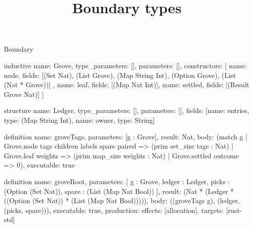 \begin{lexlean}{Boundary}
\title{Boundary types}
\begin{semanticmodule}
inductive{
  name: Grove,
  type_parameters: [],
  parameters: [],
  constructors: [
    {
      name: node,
      fields: [(Set Nat), (List Grove), (Map String Int), (Option Grove), (List (Nat * Grove))]
    },
    {name: leaf, fields: [(Map Nat Int)]},
    {name: settled, fields: [(Result Grove Nat)]}
  ]
}

structure{
  name: Ledger,
  type_parameters: [],
  parameters: [],
  fields: [{name: entries, type: (Map String Int)}, {name: owner, type: String}]
}

definition{
  name: groveTags,
  parameters: [g : Grove],
  result: Nat,
  body: (match g
    | Grove.node tags children labels spare paired => (prim set_size tags : Nat)
    | Grove.leaf weights => (prim map_size weights : Nat)
    | Grove.settled outcome => 0),
  executable: true
}

definition{
  name: groveRoot,
  parameters: [
    g : Grove,
    ledger : Ledger,
    picks : (Option (Set Nat)),
    spare : (List (Map Nat Bool))
  ],
  result: (Nat * (Ledger * ((Option (Set Nat)) * (List (Map Nat Bool))))),
  body: ((groveTags g), (ledger, (picks, spare))),
  executable: true,
  production: {effects: [allocation], targets: [rust-std]}
}
\end{semanticmodule}
\end{lexlean}
